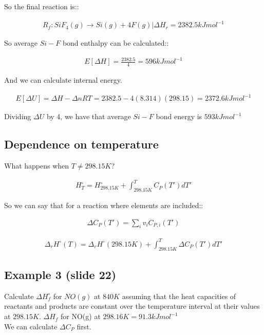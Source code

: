 \documentclass[12pt]{book}
\begin{document}
So the final reaction is::

\begin{align*}
    R_f: SiF_4(g)\rightarrow Si(g)+4F(g)|\Delta H_r=2382.5kJmol^{-1}
\end{align*}

So average $Si-F$ bond enthalpy can be calculated::

\begin{align*}
    E[\Delta H]=\frac{2382.5}{4}=596kJmol^{-1}
\end{align*}

And we can calculate internal energy.

\begin{align*}
    E[\Delta U]=\Delta H-\Delta nRT=2382.5-4(8.314)(298.15)=2372.6kJmol^{-1}
\end{align*}

Dividing $\Delta U$ by 4, we have that average $Si-F$ bond energy is $593kJmol^{-1}$

\subsection*{Dependence on temperature}

What happens when $T\neq 298.15K$?

\begin{align*}
    H_T^{\circ}=H_{298.15K}^{\circ}+\int_{298.15K}^{T}C_P(T')dT'
\end{align*}

So we can say that for a reaction where elements are included::

\begin{align*}
    \Delta C_P(T')=\sum_{i}v_i C_{P,i}(T')
\end{align*}

\begin{align*}
    \Delta_r H^{\circ}(T)=\Delta_r H^{\circ}(298.15K)+\int_{298.15K}^{T}\Delta C_P(T')dT' 
\end{align*}

\subsection*{Example 3 (slide 22)}
Calculate $\Delta H_f^{\circ}$ for $NO(g)$ at $840K$ assuming that the heat
capacities of reactants and products are constant over
the temperature interval at their values at $298.15K$. $\Delta H_f$ for NO(g) at $298.16K=91.3kJmol^{-1}$\\ We can calculate $\Delta C_P$ first.
\end{document}
